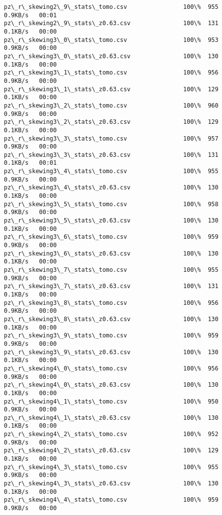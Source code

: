 \documentclass[11pt]{article}
\begin{document}
\begin{Verbatim}[commandchars=\\\{\}]
pz\_r\_skewing2\_9\_stats\_tomo.csv                100\%  955     0.9KB/s   00:01    
pz\_r\_skewing2\_9\_stats\_z0.63.csv               100\%  131     0.1KB/s   00:00    
pz\_r\_skewing3\_0\_stats\_tomo.csv                100\%  953     0.9KB/s   00:00    
pz\_r\_skewing3\_0\_stats\_z0.63.csv               100\%  130     0.1KB/s   00:00    
pz\_r\_skewing3\_1\_stats\_tomo.csv                100\%  956     0.9KB/s   00:00    
pz\_r\_skewing3\_1\_stats\_z0.63.csv               100\%  129     0.1KB/s   00:00    
pz\_r\_skewing3\_2\_stats\_tomo.csv                100\%  960     0.9KB/s   00:00    
pz\_r\_skewing3\_2\_stats\_z0.63.csv               100\%  129     0.1KB/s   00:00    
pz\_r\_skewing3\_3\_stats\_tomo.csv                100\%  957     0.9KB/s   00:00    
pz\_r\_skewing3\_3\_stats\_z0.63.csv               100\%  131     0.1KB/s   00:01    
pz\_r\_skewing3\_4\_stats\_tomo.csv                100\%  955     0.9KB/s   00:00    
pz\_r\_skewing3\_4\_stats\_z0.63.csv               100\%  130     0.1KB/s   00:00    
pz\_r\_skewing3\_5\_stats\_tomo.csv                100\%  958     0.9KB/s   00:00    
pz\_r\_skewing3\_5\_stats\_z0.63.csv               100\%  130     0.1KB/s   00:00    
pz\_r\_skewing3\_6\_stats\_tomo.csv                100\%  959     0.9KB/s   00:00    
pz\_r\_skewing3\_6\_stats\_z0.63.csv               100\%  130     0.1KB/s   00:00    
pz\_r\_skewing3\_7\_stats\_tomo.csv                100\%  955     0.9KB/s   00:00    
pz\_r\_skewing3\_7\_stats\_z0.63.csv               100\%  131     0.1KB/s   00:00    
pz\_r\_skewing3\_8\_stats\_tomo.csv                100\%  956     0.9KB/s   00:00    
pz\_r\_skewing3\_8\_stats\_z0.63.csv               100\%  130     0.1KB/s   00:00    
pz\_r\_skewing3\_9\_stats\_tomo.csv                100\%  959     0.9KB/s   00:00    
pz\_r\_skewing3\_9\_stats\_z0.63.csv               100\%  130     0.1KB/s   00:00    
pz\_r\_skewing4\_0\_stats\_tomo.csv                100\%  956     0.9KB/s   00:00    
pz\_r\_skewing4\_0\_stats\_z0.63.csv               100\%  130     0.1KB/s   00:00    
pz\_r\_skewing4\_1\_stats\_tomo.csv                100\%  950     0.9KB/s   00:00    
pz\_r\_skewing4\_1\_stats\_z0.63.csv               100\%  130     0.1KB/s   00:00    
pz\_r\_skewing4\_2\_stats\_tomo.csv                100\%  952     0.9KB/s   00:00    
pz\_r\_skewing4\_2\_stats\_z0.63.csv               100\%  129     0.1KB/s   00:00    
pz\_r\_skewing4\_3\_stats\_tomo.csv                100\%  955     0.9KB/s   00:00    
pz\_r\_skewing4\_3\_stats\_z0.63.csv               100\%  130     0.1KB/s   00:00    
pz\_r\_skewing4\_4\_stats\_tomo.csv                100\%  959     0.9KB/s   00:00    

\end{Verbatim}
\end{document}
